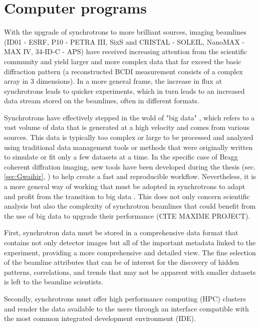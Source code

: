 \section{Computer programs}

With the upgrade of synchrotrons to more brilliant sources, imaging beamlines (ID01 - ESRF, P10 - PETRA III, SixS and CRISTAL - SOLEIL, NanoMAX - MAX IV, 34-ID-C - APS) have received increasing attention from the scientific community and yield larger and more complex data that far exceed the basic diffraction pattern (a reconstructed BCDI measurement consists of a complex array in 3 dimensions).
In a more general frame, the increase in flux at synchrotrons leads to quicker experiments, which in turn leads to an increased data stream stored on the beamlines, often in different formats.

Synchrotrons have effectively stepped in the wold of "big data" \parencite{Alizada2017, Wang2018}, which refers to a vast volume of data that is generated at a high velocity and comes from various sources.
This data is typically too complex or large to be processed and analyzed using traditional data management tools or methods that were originally written to simulate or fit only a few datasets at a time.
In the specific case of Bragg coherent diffration imaging, new tools have been developed during the thesis (sec. \ref{sec:Gwaihir}, \cite{jerome_carnis_2021_5741935, Simonne2022}) to help create a fast and reproducible workflow.
Nevertheless, it is a more general way of working that must be adopted in synchrotrons to adapt and profit from the transition to big data \parencite{Wang2018}.
This does not only concern scientific analysis but also the complexity of synchrotron beamlines that could benefit from the use of big data to upgrade their performance (CITE MAXIME PROJECT).

First, synchrotron data must be stored in a comprehensive data format \parencite{Konnecke2015} that contains not only detector images but all of the important metadata linked to the experiment, providing a more comprehensive and detailed view.
The fine selection of the beamline attributes that can be of interest for the discovery of hidden patterns, correlations, and trends that may not be apparent with smaller datasets is left to the beamline scientists.

Secondly, synchrotrons must offer high performance computing (HPC) clusters \parencite{Wang2021} and render the data available to the users through an interface compatible with the most common integrated development environment (IDE).

